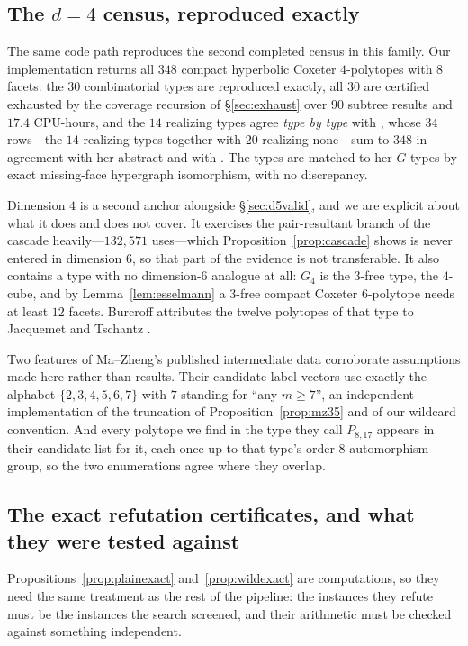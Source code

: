 \documentclass[11pt,reqno]{amsart}
\theoremstyle{plain}
\theoremstyle{definition}
\newcommand{\DFourTarget}{348}
\begin{document}
\subsection{The $d=4$ census, reproduced exactly}
\label{sec:d4valid}

The same code path reproduces the second completed census in this family. Our
implementation returns all $\DFourTarget$ compact hyperbolic Coxeter
$4$-polytopes with $8$ facets: the $30$ combinatorial types are reproduced
exactly, all $30$ are certified exhausted by the coverage recursion of
\S\ref{sec:exhaust} over $90$ subtree results and $17.4$ CPU-hours, and the $14$
realizing types agree \emph{type by type} with \cite[Appendix~A]{Burcroff2024},
whose $34$ rows---the $14$ realizing types together with $20$ realizing
none---sum to $\DFourTarget$ in agreement with her abstract and with
\cite[Thm.~1.1]{MaZheng2024}. The types are matched to her $G$-types by exact
missing-face hypergraph isomorphism, with no discrepancy.

Dimension $4$ is a second anchor alongside \S\ref{sec:d5valid}, and we are
explicit about what it does and does not cover. It exercises the pair-resultant
branch of the cascade heavily---$132{,}571$ uses---which
Proposition~\ref{prop:cascade} shows is never entered in dimension $6$, so that
part of the evidence is not transferable. It also contains a type with no
dimension-$6$ analogue at all: $G_4$ is the $3$-free type, the $4$-cube, and by
Lemma~\ref{lem:esselmann} a $3$-free compact Coxeter $6$-polytope needs at least
$12$ facets. Burcroff attributes the twelve polytopes of that type to Jacquemet
and Tschantz \cite{JacquemetTschantz2018}.

Two features of Ma--Zheng's published intermediate data corroborate assumptions
made here rather than results. Their candidate label vectors use exactly the
alphabet $\{2,3,4,5,6,7\}$ with $7$ standing for ``any $m\ge7$'', an independent
implementation of the truncation of Proposition~\ref{prop:mz35} and of our
wildcard convention. And every polytope we find in the type they call $P_{8,17}$
appears in their candidate list for it, each once up to that type's order-$8$
automorphism group, so the two enumerations agree where they overlap.

\subsection{The exact refutation certificates, and what they were tested against}
\label{sec:wildvalid}
Propositions~\ref{prop:plainexact} and~\ref{prop:wildexact} are computations, so
they need the same treatment as the rest of the pipeline: the instances they refute
must be the instances the search screened, and their arithmetic must be checked
against something independent.
\end{document}
